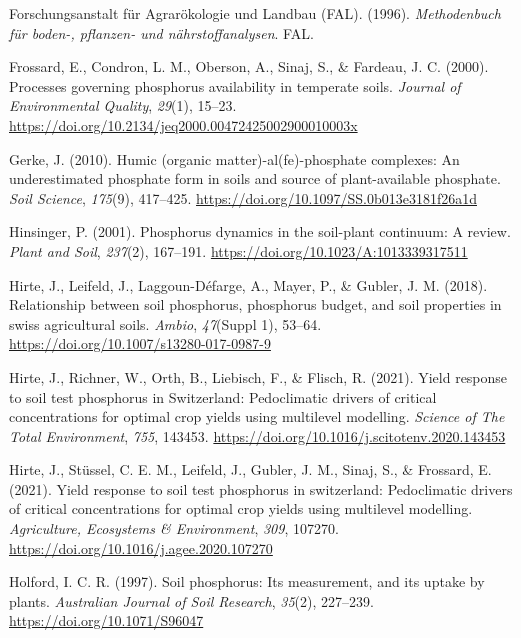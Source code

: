 \documentclass[
  a4paper,
]{article}
\newlength{\cslhangindent}
\newenvironment{CSLReferences}[2] %
 {\begin{list}{}{%
  \setlength{\itemindent}{0pt}
  \setlength{\leftmargin}{0pt}
  \setlength{\parsep}{0pt}
  \ifodd #1
   \setlength{\leftmargin}{\cslhangindent}
   \setlength{\itemindent}{-1\cslhangindent}
  \fi
  \setlength{\itemsep}{#2\baselineskip}}}
 {\end{list}}
\begin{document}
\begin{CSLReferences}{1}{0}
Forschungsanstalt für Agrarökologie und Landbau (FAL). (1996).
\emph{Methodenbuch für boden-, pflanzen- und nährstoffanalysen}. FAL.

Frossard, E., Condron, L. M., Oberson, A., Sinaj, S., \& Fardeau, J. C.
(2000). Processes governing phosphorus availability in temperate soils.
\emph{Journal of Environmental Quality}, \emph{29}(1), 15--23.
\url{https://doi.org/10.2134/jeq2000.00472425002900010003x}

Gerke, J. (2010). Humic (organic matter)-al(fe)-phosphate complexes: An
underestimated phosphate form in soils and source of plant-available
phosphate. \emph{Soil Science}, \emph{175}(9), 417--425.
\url{https://doi.org/10.1097/SS.0b013e3181f26a1d}

Hinsinger, P. (2001). Phosphorus dynamics in the soil-plant continuum: A
review. \emph{Plant and Soil}, \emph{237}(2), 167--191.
\url{https://doi.org/10.1023/A:1013339317511}

Hirte, J., Leifeld, J., Laggoun-Défarge, A., Mayer, P., \& Gubler, J. M.
(2018). Relationship between soil phosphorus, phosphorus budget, and
soil properties in swiss agricultural soils. \emph{Ambio},
\emph{47}(Suppl 1), 53--64.
\url{https://doi.org/10.1007/s13280-017-0987-9}

Hirte, J., Richner, W., Orth, B., Liebisch, F., \& Flisch, R. (2021).
Yield response to soil test phosphorus in {Switzerland}: {Pedoclimatic}
drivers of critical concentrations for optimal crop yields using
multilevel modelling. \emph{Science of The Total Environment},
\emph{755}, 143453.
\url{https://doi.org/10.1016/j.scitotenv.2020.143453}

Hirte, J., Stüssel, C. E. M., Leifeld, J., Gubler, J. M., Sinaj, S., \&
Frossard, E. (2021). Yield response to soil test phosphorus in
switzerland: Pedoclimatic drivers of critical concentrations for optimal
crop yields using multilevel modelling. \emph{Agriculture, Ecosystems \&
Environment}, \emph{309}, 107270.
\url{https://doi.org/10.1016/j.agee.2020.107270}

Holford, I. C. R. (1997). Soil phosphorus: Its measurement, and its
uptake by plants. \emph{Australian Journal of Soil Research},
\emph{35}(2), 227--239. \url{https://doi.org/10.1071/S96047}


\end{CSLReferences}
\end{document}
